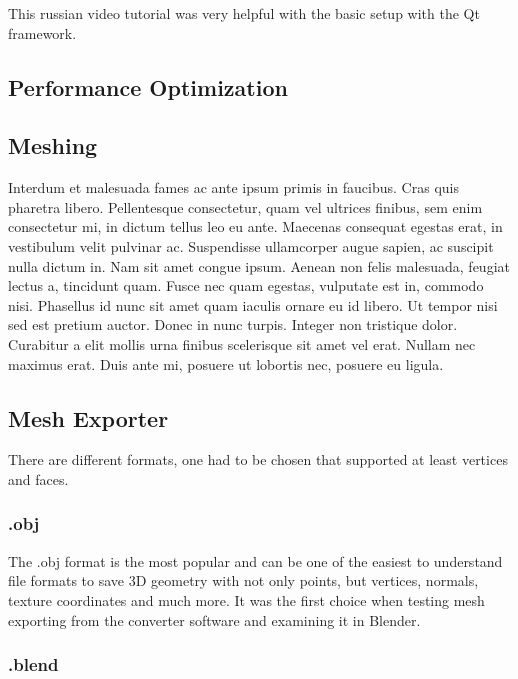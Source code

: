 This russian video tutorial was very helpful with the basic setup with the Qt framework.

\cite{ytQtOpenGL}

\subsection{Performance Optimization}


\subsection{Meshing}

Interdum et malesuada fames ac ante ipsum primis in faucibus. Cras quis pharetra libero. Pellentesque consectetur, quam vel ultrices finibus, sem enim consectetur mi, in dictum tellus leo eu ante. Maecenas consequat egestas erat, in vestibulum velit pulvinar ac. Suspendisse ullamcorper augue sapien, ac suscipit nulla dictum in. Nam sit amet congue ipsum. Aenean non felis malesuada, feugiat lectus a, tincidunt quam. Fusce nec quam egestas, vulputate est in, commodo nisi. Phasellus id nunc sit amet quam iaculis ornare eu id libero. Ut tempor nisi sed est pretium auctor. Donec in nunc turpis. Integer non tristique dolor. Curabitur a elit mollis urna finibus scelerisque sit amet vel erat. Nullam nec maximus erat. Duis ante mi, posuere ut lobortis nec, posuere eu ligula.



\subsection{Mesh Exporter}

There are different formats, one had to be chosen that supported at least vertices and faces.

\subsubsection{.obj}

The .obj format is the most popular and can be one of the easiest to understand file formats to save 3D geometry with not only points, but vertices, normals, texture coordinates and much more. It was the first choice when testing mesh exporting from the converter software and examining it in Blender.

\subsubsection{.blend}

